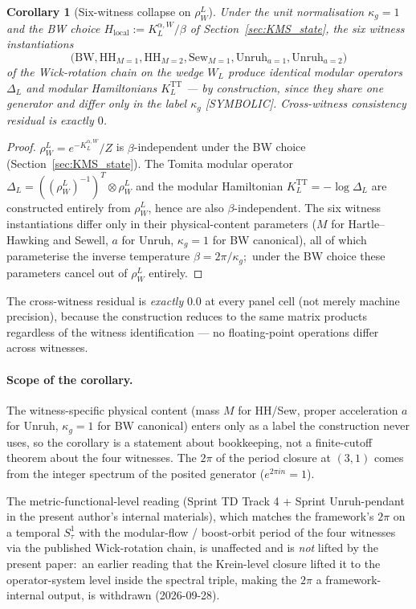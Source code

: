 \documentclass[11pt,a4paper]{article}
\theoremstyle{plain}
\newtheorem{corollary}[theorem]{Corollary}
\theoremstyle{definition}
\newcommand{\KL}{K_{L}}
\newcommand{\TT}{\mathrm{TT}}
\newcommand{\BW}{\mathrm{BW}}
\newcommand{\HH}{\mathrm{HH}}
\newcommand{\Sew}{\mathrm{Sew}}
\newcommand{\Unruh}{\mathrm{Unruh}}
\begin{document}
\begin{corollary}[Six-witness collapse on $\rho_W^L$]\label{cor:six_witness}
Under the unit normalisation $\kappa_g = 1$ and the BW choice
$H_{\mathrm{local}} := \KL^{\alpha, W} / \beta$ of
Section~\ref{sec:KMS_state}, the six witness instantiations
\[
   \bigl(\BW, \HH_{M=1}, \HH_{M=2}, \Sew_{M=1}, \Unruh_{a=1},
   \Unruh_{a=2}\bigr)
\]
of the Wick-rotation chain on the wedge $W_L$ produce identical
modular operators $\Delta_L$ and modular Hamiltonians $\KL^\TT$ ---
by construction, since they share one generator and differ only in
the label $\kappa_g$ [SYMBOLIC]. Cross-witness consistency residual is
exactly $0$.
\end{corollary}

\begin{proof}
$\rho_W^L = e^{-\KL^{\alpha, W}}/Z$ is $\beta$-independent under the
BW choice (Section~\ref{sec:KMS_state}). The Tomita modular operator
$\Delta_L = ((\rho_W^L)^{-1})^T \otimes \rho_W^L$ and the modular
Hamiltonian $\KL^\TT = -\log \Delta_L$ are constructed entirely from
$\rho_W^L$, hence are also $\beta$-independent. The six witness
instantiations differ only in their physical-content parameters
($M$ for Hartle--Hawking and Sewell, $a$ for Unruh, $\kappa_g = 1$ for
BW canonical), all of which parameterise the inverse temperature
$\beta = 2\pi/\kappa_g$;\ under the BW choice these parameters
cancel out of $\rho_W^L$ entirely.
\end{proof}

The cross-witness residual is \emph{exactly} $0.0$ at every panel cell
(not merely machine precision), because the construction reduces to
the same matrix products regardless of the witness identification — no
floating-point operations differ across witnesses.

\paragraph{Scope of the corollary.}
The witness-specific physical content (mass $M$ for HH/Sew, proper
acceleration $a$ for Unruh, $\kappa_g = 1$ for BW canonical) enters
only as a label the construction never uses, so the corollary is a
statement about bookkeeping, not a finite-cutoff theorem about the
four witnesses.  The $2\pi$ of the period closure at $(3, 1)$ comes
from the integer spectrum of the posited generator
($e^{2\pi i n} = 1$).

The metric-functional-level reading (Sprint TD Track 4 + Sprint
Unruh-pendant in the present author's internal materials), which
matches the framework's $2\pi$ on a temporal $S^1_\tau$ with the
modular-flow / boost-orbit period of the four witnesses via the
published Wick-rotation chain, is unaffected and is \emph{not} lifted
by the present paper:\ an earlier reading that the Krein-level closure
lifted it to the operator-system level inside the spectral triple,
making the $2\pi$ a framework-internal output, is withdrawn
(2026-09-28).
\end{document}
